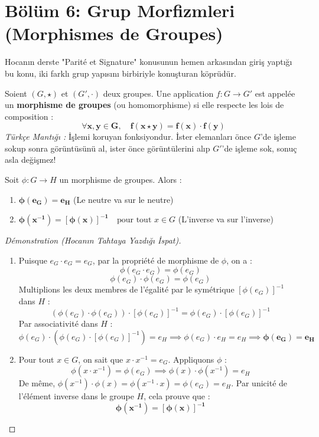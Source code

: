 \documentclass[12pt,a4paper]{report}
\begin{document}
\newpage
\section{Bölüm 6: Grup Morfizmleri (Morphismes de Groupes)}

Hocanın derste "Parité et Signature" konusunun hemen arkasından giriş yaptığı bu konu, iki farklı grup yapısını birbiriyle konuşturan köprüdür.

\begin{tcolorbox}[colback=blue!5!white,colframe=blue!75!black,title=Grup Morfizması Tanımı (Morphisme de Groupes)]
Soient $(G, \star)$ et $(G', \cdot)$ deux groupes.  
Une application $f : G \longrightarrow G'$ est appelée un \textbf{morphisme de groupes} (ou homomorphisme) si elle respecte les lois de composition :
\[ \mathbf{\forall x, y \in G, \quad f(x \star y) = f(x) \cdot f(y)} \]
\textit{Türkçe Mantığı :} İşlemi koruyan fonksiyondur. İster elemanları önce $G$'de işleme sokup sonra görüntüsünü al, ister önce görüntülerini alıp $G'$'de işleme sok, sonuç asla değişmez!
\end{tcolorbox}

\begin{tcolorbox}[colback=teal!5!white,colframe=teal!80!black,title=Proposition (Hocanın Tahtaya Yazdığı Teorem) : Propriétés Fondamentales]
Soit $\phi : G \longrightarrow H$ un morphisme de groupes. Alors :
\begin{enumerate}
    \item $\mathbf{\phi(e_G) = e_H}$ \quad (Le neutre va sur le neutre)
    \item $\mathbf{\phi(x^{-1}) = [\phi(x)]^{-1}} \quad \text{pour tout } x \in G$ \quad (L'inverse va sur l'inverse)
\end{enumerate}
\end{tcolorbox}

\begin{proof}[Démonstration (Hocanın Tahtaya Yazdığı İspat)]
\begin{enumerate}
    \item Puisque $e_G \cdot e_G = e_G$, par la propriété de morphisme de $\phi$, on a :
    \[ \phi(e_G \cdot e_G) = \phi(e_G) \]
    \[ \phi(e_G) \cdot \phi(e_G) = \phi(e_G) \]
    Multiplions les deux membres de l'égalité par le symétrique $[\phi(e_G)]^{-1}$ dans $H$ :
    \[ (\phi(e_G) \cdot \phi(e_G)) \cdot [\phi(e_G)]^{-1} = \phi(e_G) \cdot [\phi(e_G)]^{-1} \]
    Par associativité dans $H$ :
    \[ \phi(e_G) \cdot (\phi(e_G) \cdot [\phi(e_G)]^{-1}) = e_H \implies \phi(e_G) \cdot e_H = e_H \implies \mathbf{\phi(e_G) = e_H} \]

    \item Pour tout $x \in G$, on sait que $x \cdot x^{-1} = e_G$. Appliquons $\phi$ :
    \[ \phi(x \cdot x^{-1}) = \phi(e_G) \implies \phi(x) \cdot \phi(x^{-1}) = e_H \]
    De même, $\phi(x^{-1}) \cdot \phi(x) = \phi(x^{-1} \cdot x) = \phi(e_G) = e_H$.  
    Par unicité de l'élément inverse dans le groupe $H$, cela prouve que :
    \[ \mathbf{\phi(x^{-1}) = [\phi(x)]^{-1}} \]
\end{enumerate}
\end{proof}
\end{document}
